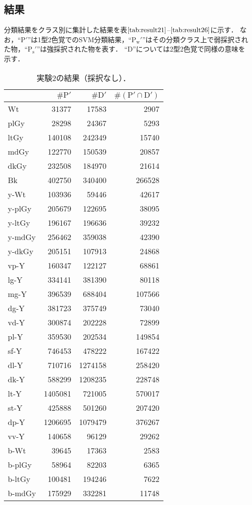 \documentclass[uplatex,paper=a4,fontsize=4.0truemm,jafontsize=4.0truemm,head_space=30.0truemm,foot_space=30.0truemm,baselineskip=8.0truemm,line_length=40zw,gutter=25.0truemm,oneside,openany,fleqn,hanging_panctuation,open_bracket_pos=nibu_tentsuki,dvipdfmx,jis2004,book,titlepage]{jlreq}
\theoremstyle{mystyle}
\newcommand{\captiondot}[1]{\caption{#1．}}
\newcommand{\tableinput}[4]{\begin{table}[btp]\centering\captiondot{#3}\label{tab:#4}\begin{tabular}{#1}#2\end{tabular}\end{table}}
\newcommand{\mathdisplaystyle}[1]{\(\displaystyle{#1}\)}
\newcommand{\Reference}[1]{\mathdisplaystyle{\ref{#1}}}
\newcommand{\parentheses}[1]{\left(#1\right)}
\begin{document}
			\subsection{結果}
				分類結果をクラス別に集計した結果を表\Reference{tab:result21}--\Reference{tab:result26}に示す．
				なお，``\mathdisplaystyle{\textrm{P}'}''は1型2色覚でのSVM分類結果，``\mathdisplaystyle{\textrm{P}_\textrm{w}'}''はその分類クラス上で弱採択された物，``\mathdisplaystyle{\textrm{P}_\textrm{s}'}''は強採択された物を表す．
				``D''については2型2色覚で同様の意味を示す．
				\tableinput{l|rrr}{ & \(\#\textrm{P}'\) & \(\#\textrm{D}'\) & \(\#\parentheses{\textrm{P}'\cap\textrm{D}'}\) \\ \hline
					Wt & 31377 & 17583 & 2907 \\
					plGy & 28298 & 24367 & 5293 \\
					ltGy & 140108 & 242349 & 15740 \\
					mdGy & 122770 & 150539 & 20857 \\
					dkGy & 232508 & 184970 & 21614 \\
					Bk & 402750 & 340400 & 266528 \\
					y-Wt & 103936 & 59446 & 42617 \\
					y-plGy & 205679 & 122695 & 38095 \\
					y-ltGy & 196167 & 196636 & 39232 \\
					y-mdGy & 256462 & 359038 & 42390 \\
					y-dkGy & 205151 & 107913 & 24868 \\
					vp-Y & 160347 & 122127 & 68861 \\
					lg-Y & 334141 & 381390 & 80118 \\
					mg-Y & 396539 & 688404 & 107566 \\
					dg-Y & 381723 & 375749 & 73040 \\
					vd-Y & 300874 & 202228 & 72899 \\
					pl-Y & 359530 & 202534 & 149854 \\
					sf-Y & 746453 & 478222 & 167422 \\
					dl-Y & 710716 & 1274158 & 258420 \\
					dk-Y & 588299 & 1208235 & 228748 \\
					lt-Y & 1405081 & 721005 & 570017 \\
					st-Y & 425888 & 501260 & 207420 \\
					dp-Y & 1206695 & 1079479 & 376267 \\
					vv-Y & 140658 & 96129 & 29262 \\
					b-Wt & 39645 & 17363 & 2583 \\
					b-plGy & 58964 & 82203 & 6365 \\
					b-ltGy & 100481 & 194246 & 7622 \\
					b-mdGy & 175929 & 332281 & 11748}{実験2の結果（採択なし）}{result21}
\end{document}
